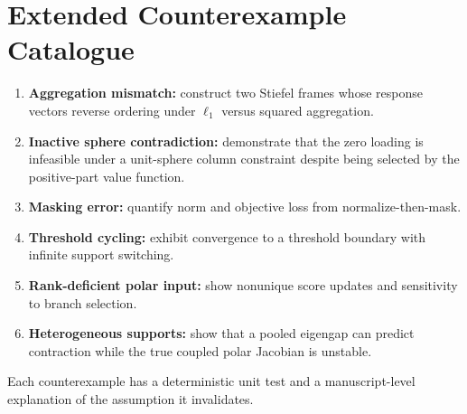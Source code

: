 \section{Extended Counterexample Catalogue}
\begin{enumerate}[leftmargin=*]
\item \textbf{Aggregation mismatch:} construct two Stiefel frames whose response vectors reverse ordering under $\ell_1$ versus squared aggregation.
\item \textbf{Inactive sphere contradiction:} demonstrate that the zero loading is infeasible under a unit-sphere column constraint despite being selected by the positive-part value function.
\item \textbf{Masking error:} quantify norm and objective loss from normalize-then-mask.
\item \textbf{Threshold cycling:} exhibit convergence to a threshold boundary with infinite support switching.
\item \textbf{Rank-deficient polar input:} show nonunique score updates and sensitivity to branch selection.
\item \textbf{Heterogeneous supports:} show that a pooled eigengap can predict contraction while the true coupled polar Jacobian is unstable.
\end{enumerate}
Each counterexample has a deterministic unit test and a manuscript-level explanation of the assumption it invalidates.
